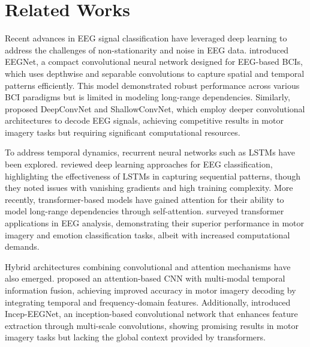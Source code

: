 \documentclass[pdflatex,sn-mathphys-num]{sn-jnl}%
\theoremstyle{thmstyleone}%
\theoremstyle{thmstyletwo}%
\theoremstyle{thmstylethree}%
\begin{document}

\section{Related Works}
Recent advances in EEG signal classification have leveraged deep learning to address the challenges of non-stationarity and noise in EEG data. \citet{lawhern2018eegnet} introduced EEGNet, a compact convolutional neural network designed for EEG-based BCIs, which uses depthwise and separable convolutions to capture spatial and temporal patterns efficiently. This model demonstrated robust performance across various BCI paradigms but is limited in modeling long-range dependencies. Similarly, \citet{schirrmeister2017deep} proposed DeepConvNet and ShallowConvNet, which employ deeper convolutional architectures to decode EEG signals, achieving competitive results in motor imagery tasks but requiring significant computational resources.

To address temporal dynamics, recurrent neural networks such as LSTMs have been explored. \citet{craik2019deep} reviewed deep learning approaches for EEG classification, highlighting the effectiveness of LSTMs in capturing sequential patterns, though they noted issues with vanishing gradients and high training complexity. More recently, transformer-based models have gained attention for their ability to model long-range dependencies through self-attention. \citet{vafaei2025transformers} surveyed transformer applications in EEG analysis, demonstrating their superior performance in motor imagery and emotion classification tasks, albeit with increased computational demands.

Hybrid architectures combining convolutional and attention mechanisms have also emerged. \citet{ma2024attention} proposed an attention-based CNN with multi-modal temporal information fusion, achieving improved accuracy in motor imagery decoding by integrating temporal and frequency-domain features. Additionally, \citet{zhang2020inception} introduced Incep-EEGNet, an inception-based convolutional network that enhances feature extraction through multi-scale convolutions, showing promising results in motor imagery tasks but lacking the global context provided by transformers.
\end{document}
